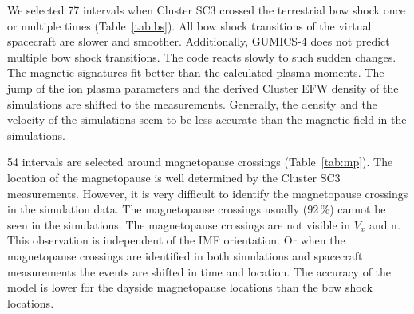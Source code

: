 \documentclass[b5paper,10pt]{article}
\begin{document}

We selected 77 intervals when Cluster SC3 crossed the terrestrial bow shock once or multiple times (Table~\ref{tab:bs}). %
All bow shock transitions of the virtual spacecraft are slower and smoother. Additionally, GUMICS-4 does not predict multiple bow shock transitions. The code reacts slowly to such sudden changes. The magnetic signatures fit better than the calculated plasma moments. The jump of the ion plasma parameters and the derived Cluster EFW density of the simulations are shifted to the measurements. Generally, the density and the velocity of the simulations seem to be less accurate than the magnetic field in the simulations.

54 intervals are selected around magnetopause crossings (Table~\ref{tab:mp}). %
The location of the magnetopause is well determined by the Cluster SC3 measurements. However, it is very difficult to identify the magnetopause crossings in the simulation data. The magnetopause crossings usually (92\,\%) cannot be seen in the simulations. The magnetopause crossings are not visible in $V_{x}$ and n. This observation is independent of the IMF orientation. Or when the magnetopause crossings are identified in both simulations and spacecraft measurements the events are shifted in time and location. The accuracy of the model is lower for the dayside magnetopause locations than the bow shock locations. 
\end{document}
